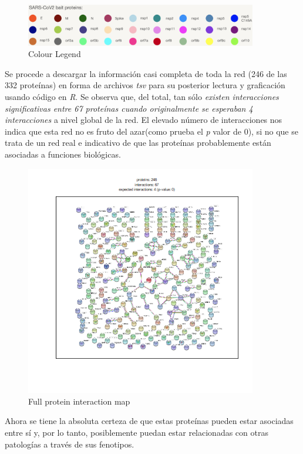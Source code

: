 	\begin{figure}[h!]
		\includegraphics[width=0.9\textwidth]{figures/PPIColourLegend.png}
		\caption{Colour Legend}
		\label{fig:ppi_legend}
	\end{figure}

Se procede a descargar la información casi completa de toda la red (246 de las 332 proteínas) en forma de archivos \textit{tsv} para su posterior lectura y graficación usando código en \textit{R}. Se observa que, del total, tan sólo \emph{existen interacciones significativas entre 67 proteínas cuando originalmente se esperaban 4 interacciones} a nivel global de la red. El elevado número de interacciones nos indica que esta red no es fruto del azar(como prueba el \textit{p} valor de 0), si no que se trata de un red real e indicativo de que las proteínas probablemente están asociadas a funciones biológicas.

	\begin{figure}[h!]
		\includegraphics[width=0.9\textwidth]{figures/figuraSTRINGdb.png}
		\caption{Full protein interaction map}
		\label{fig:ppi_stringdb}
	\end{figure}

Ahora se tiene la absoluta certeza de que estas proteínas pueden estar asociadas entre sí y, por lo tanto, posiblemente puedan estar relacionadas con otras patologías a través de sus fenotipos.
	
